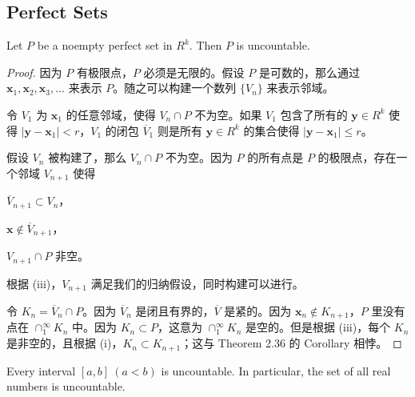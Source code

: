 \documentclass[../poma-notes.tex]{subfiles}
\begin{document}
\subsection*{Perfect Sets}

\begin{theorem}
  Let $P$ be a noempty perfect set in $R^k$. Then $P$ is uncountable.
\end{theorem}

\begin{proof}
  因为 $P$ 有极限点，$P$ 必须是无限的。假设 $P$ 是可数的，那么通过 $\mathbf{x}_1,\mathbf{x}_2,\mathbf{x}_3,\dots$
  来表示 $P$。随之可以构建一个数列 $\{V_n\}$ 来表示邻域。

  令 $V_1$ 为 $\mathbf{x}_1$ 的任意邻域，使得 $V_n \cap P$ 不为空。如果 $V_1$ 包含了所有的 $\mathbf{y} \in R^k$ 使得
  $|\mathbf{y} - \mathbf{x}_1| < r$，$V_1$ 的闭包 $\overline{V}_1$ 则是所有 $\mathbf{y} \in R^k$ 的集合使得
  $|\mathbf{y} - \mathbf{x}_1| \le r$。

  假设 $V_n$ 被构建了，那么 $V_n \cap P$ 不为空。因为 $P$ 的所有点是 $P$ 的极限点，存在一个邻域 $V_{n+1}$ 使得
  \begin{enumerate*}[label=(\roman*)]
    \item $\overline{V}_{n+1} \subset V_n$，
    \item $\mathbf{x} \notin \overline{V}_{n+1}$，
    \item $V_{n+1} \cap P$ 非空。
  \end{enumerate*}
  根据 (iii)，$V_{n+1}$ 满足我们的归纳假设，同时构建可以进行。

  令 $K_n = \overline{V}_n \cap P$。因为 $\overline{V}_n$ 是闭且有界的，$\overline{V}$ 是紧的。因为
  $\mathbf{x}_n \notin K_{n+1}$，$P$ 里没有点在 $\cap_1^{\infty} K_n$ 中。因为 $K_n \subset P$，这意为
  $\cap_1^{\infty} K_n$ 是空的。但是根据 (iii)，每个 $K_n$ 是非空的，且根据 (i)，$K_n \subset K_{n+1}$；这与 Theorem 2.36
  的 Corollary 相悖。
\end{proof}

\begin{corollary}
  Every interval $[a,b]\ (a<b)$ is uncountable. In particular, the set of all real numbers is uncountable.
\end{corollary}
\end{document}

